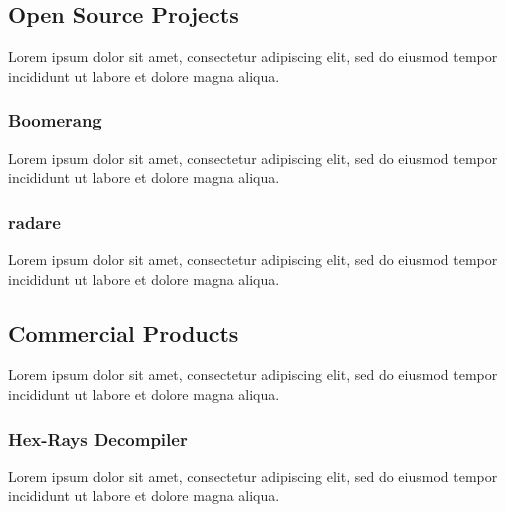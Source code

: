 \documentclass[12pt, a4paper]{article}
\begin{document}
\subsection{Open Source Projects}

Lorem ipsum dolor sit amet, consectetur adipiscing elit, sed do eiusmod tempor incididunt ut labore et dolore magna aliqua.


\subsubsection{Boomerang}

Lorem ipsum dolor sit amet, consectetur adipiscing elit, sed do eiusmod tempor incididunt ut labore et dolore magna aliqua.

\cite{boomerang}


\subsubsection{radare}

Lorem ipsum dolor sit amet, consectetur adipiscing elit, sed do eiusmod tempor incididunt ut labore et dolore magna aliqua.

\cite{radare}


\subsection{Commercial Products}

Lorem ipsum dolor sit amet, consectetur adipiscing elit, sed do eiusmod tempor incididunt ut labore et dolore magna aliqua.



\subsubsection{Hex-Rays Decompiler}

Lorem ipsum dolor sit amet, consectetur adipiscing elit, sed do eiusmod tempor incididunt ut labore et dolore magna aliqua.
\end{document}
